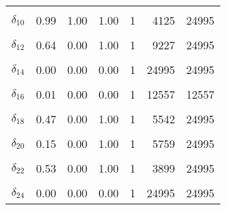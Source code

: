 \begin{longtable}[t]{lrrrrrr}
\cellcolor{gray!6}{$\delta_{9}$} & \cellcolor{gray!6}{0.83} & \cellcolor{gray!6}{0.00} & \cellcolor{gray!6}{1.00} & \cellcolor{gray!6}{1} & \cellcolor{gray!6}{1776} & \cellcolor{gray!6}{24995}\\
$\delta_{10}$ & 0.99 & 1.00 & 1.00 & 1 & 4125 & 24995\\
\cellcolor{gray!6}{$\delta_{11}$} & \cellcolor{gray!6}{0.25} & \cellcolor{gray!6}{0.00} & \cellcolor{gray!6}{1.00} & \cellcolor{gray!6}{1} & \cellcolor{gray!6}{12745} & \cellcolor{gray!6}{24995}\\
$\delta_{12}$ & 0.64 & 0.00 & 1.00 & 1 & 9227 & 24995\\
\cellcolor{gray!6}{$\delta_{13}$} & \cellcolor{gray!6}{0.04} & \cellcolor{gray!6}{0.00} & \cellcolor{gray!6}{0.00} & \cellcolor{gray!6}{1} & \cellcolor{gray!6}{21219} & \cellcolor{gray!6}{21219}\\
$\delta_{14}$ & 0.00 & 0.00 & 0.00 & 1 & 24995 & 24995\\
\cellcolor{gray!6}{$\delta_{15}$} & \cellcolor{gray!6}{0.44} & \cellcolor{gray!6}{0.00} & \cellcolor{gray!6}{1.00} & \cellcolor{gray!6}{1} & \cellcolor{gray!6}{7732} & \cellcolor{gray!6}{24995}\\
$\delta_{16}$ & 0.01 & 0.00 & 0.00 & 1 & 12557 & 12557\\
\cellcolor{gray!6}{$\delta_{17}$} & \cellcolor{gray!6}{0.21} & \cellcolor{gray!6}{0.00} & \cellcolor{gray!6}{1.00} & \cellcolor{gray!6}{1} & \cellcolor{gray!6}{12408} & \cellcolor{gray!6}{24995}\\
$\delta_{18}$ & 0.47 & 0.00 & 1.00 & 1 & 5542 & 24995\\
\cellcolor{gray!6}{$\delta_{19}$} & \cellcolor{gray!6}{0.00} & \cellcolor{gray!6}{0.00} & \cellcolor{gray!6}{0.00} & \cellcolor{gray!6}{1} & \cellcolor{gray!6}{24995} & \cellcolor{gray!6}{24995}\\
$\delta_{20}$ & 0.15 & 0.00 & 1.00 & 1 & 5759 & 24995\\
\cellcolor{gray!6}{$\delta_{21}$} & \cellcolor{gray!6}{0.73} & \cellcolor{gray!6}{0.00} & \cellcolor{gray!6}{1.00} & \cellcolor{gray!6}{1} & \cellcolor{gray!6}{5658} & \cellcolor{gray!6}{24995}\\
$\delta_{22}$ & 0.53 & 0.00 & 1.00 & 1 & 3899 & 24995\\
\cellcolor{gray!6}{$\delta_{23}$} & \cellcolor{gray!6}{0.25} & \cellcolor{gray!6}{0.00} & \cellcolor{gray!6}{1.00} & \cellcolor{gray!6}{1} & \cellcolor{gray!6}{9102} & \cellcolor{gray!6}{24995}\\
$\delta_{24}$ & 0.00 & 0.00 & 0.00 & 1 & 24995 & 24995\\

\end{longtable}
